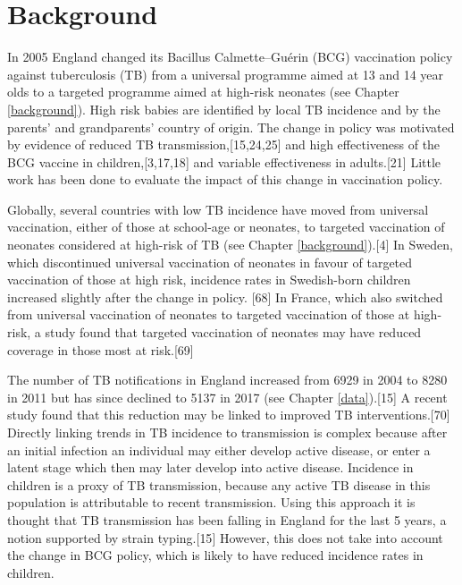 \documentclass[11pt,twoside]{bristolthesis}
\begin{document}
  \hypertarget{background-4}{%
  \section{Background}\label{background-4}}
  
  In 2005 England changed its Bacillus Calmette--Guérin (BCG) vaccination policy against tuberculosis (TB) from a universal programme aimed at 13 and 14 year olds to a targeted programme aimed at high-risk neonates (see Chapter \ref{background}). High risk babies are identified by local TB incidence and by the parents' and grandparents' country of origin. The change in policy was motivated by evidence of reduced TB transmission,{[}15,24,25{]} and high effectiveness of the BCG vaccine in children,{[}3,17,18{]} and variable effectiveness in adults.{[}21{]} Little work has been done to evaluate the impact of this change in vaccination policy.
  
  Globally, several countries with low TB incidence have moved from universal vaccination, either of those at school-age or neonates, to targeted vaccination of neonates considered at high-risk of TB (see Chapter \ref{background}).{[}4{]} In Sweden, which discontinued universal vaccination of neonates in favour of targeted vaccination of those at high risk, incidence rates in Swedish-born children increased slightly after the change in policy. {[}68{]} In France, which also switched from universal vaccination of neonates to targeted vaccination of those at high-risk, a study found that targeted vaccination of neonates may have reduced coverage in those most at risk.{[}69{]}
  
  The number of TB notifications in England increased from 6929 in 2004 to 8280 in 2011 but has since declined to 5137 in 2017 (see Chapter \ref{data}).{[}15{]} A recent study found that this reduction may be linked to improved TB interventions.{[}70{]} Directly linking trends in TB incidence to transmission is complex because after an initial infection an individual may either develop active disease, or enter a latent stage which then may later develop into active disease. Incidence in children is a proxy of TB transmission, because any active TB disease in this population is attributable to recent transmission. Using this approach it is thought that TB transmission has been falling in England for the last 5 years, a notion supported by strain typing.{[}15{]} However, this does not take into account the change in BCG policy, which is likely to have reduced incidence rates in children.
  
\end{document}
